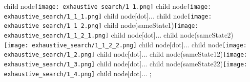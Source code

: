 child{
    node{\texttt{[image: exhaustive\_search/1\_1.png]}}
    child{
        node{\texttt{[image: exhaustive\_search/1\_1\_1.png]}}
        child{
            node[dot]{$\dots$}
        }
    } child {
        node{\texttt{[image: exhaustive\_search/1\_1\_2.png]}}
        child{
            node(sameState1){\texttt{[image: exhaustive\_search/1\_1\_2\_1.png]}}
            child{
                node[dot]{$\dots$}
            }
        } child{
            node(sameState2){\texttt{[image: exhaustive\_search/1\_1\_2\_2.png]}}
            child{
                node[dot]{$\dots$}
            }
        }
    }
} child{
    node{\texttt{[image: exhaustive\_search/1\_2.png]}}
    child{
        node[dot]{$\dots$}
    }
} child{
    node(sameState12){\texttt{[image: exhaustive\_search/1\_3.png]}}
    child{
        node[dot]{$\dots$}
    }
} child{
    node(sameState22){\texttt{[image: exhaustive\_search/1\_4.png]}}
    child{
        node[dot]{$\dots$}
    }
};